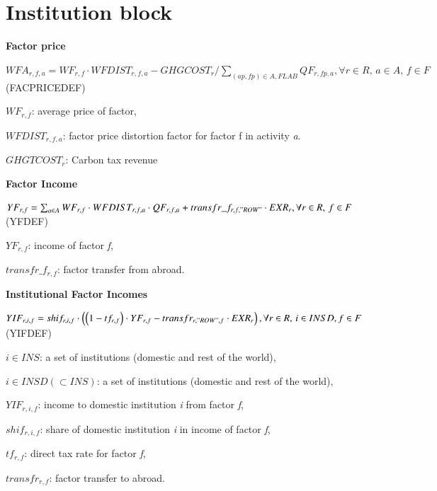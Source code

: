 \documentclass[10pt,a4paper,titlepage,dvipdfmx]{book}
\begin{document}
\section{\label{sec:InsBlo}Institution block}

\begin{flushleft}\textbf{Factor price}\end{flushleft}


\begin{center}$WFA_{r,f,a}=WF_{r,f}\cdot WFDIST_{r,f,a}-GHGCOST_{r}/\sum _{\left(ap,fp\right)\in A,FLAB}QF_{r,fp,a},\forall r\in R,\,a\in A,\,f\in F$ (FACPRICEDEF)
\end{center}

\begin{flushleft}
$WF_{r,f}$: average price of factor,

$WFDIST_{r,f,a}$: factor price distortion factor for factor f in activity \textit{a}.

$GHGTCOST_{r}$: Carbon tax revenue
\end{flushleft}

\begin{flushleft}\textbf{Factor Income}\end{flushleft}


\begin{center}$YF_{r,f}=\sum _{a\in A}WF_{r,f}\cdot WFDIST_{r,f,a}\cdot QF_{r,f,a}+transfr\_ f_{r,f,"ROW"}\cdot EXR_{r} ,\forall r\in R,\,f\in F$ (YFDEF)
\end{center}

\begin{flushleft}
$YF_{r,f}$: income of factor \textit{f},

$transfr\_f_{r,f}$: factor transfer from abroad.
\end{flushleft}

\begin{flushleft}\textbf{Institutional Factor Incomes}\end{flushleft}


\begin{center}  $YIF_{r,i,f}=shif_{r,i,f}\cdot \left(\left(1-tf_{r,f}\right)\cdot YF_{r,f}-transfr_{r,"ROW",f}\cdot EXR_{r}\right),\forall r\in R,\,i\in INSD,f\in F$ (YIFDEF)
\end{center}

\begin{flushleft}
$i\in INS$: a set of institutions (domestic and rest of the world),

$i\in INSD\left(\subset INS\right)$: a set of institutions (domestic and rest of the world),

$YIF_{r,i,f}$: income to domestic institution \textit{i} from factor \textit{f},

$shif_{r,i,f}$: share of domestic institution \textit{i} in income of factor \textit{f},

$tf_{r,f}$: direct tax rate for factor \textit{f},

$transfr_{r,f}$: factor transfer to abroad.
\end{flushleft}
\end{document}
